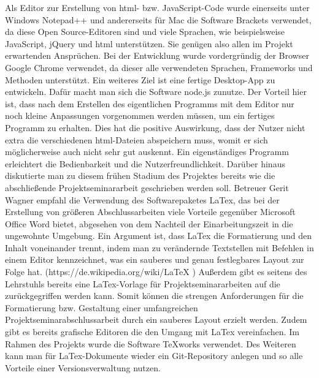Als Editor zur Erstellung von html- bzw. JavaScript-Code wurde einerseits unter Windows Notepad++ und andererseits für Mac die Software Brackets verwendet, da diese Open Source-Editoren sind und viele Sprachen, wie beispielsweise JavaScript, jQuery und html unterstützen. Sie genügen also allen im Projekt erwartenden Ansprüchen.
Bei der Entwicklung wurde vordergründig der Browser Google Chrome verwendet, da dieser alle verwendeten Sprachen, Frameworks und Methoden unterstützt. 
Ein weiteres Ziel ist eine fertige Desktop-App zu entwickeln. Dafür macht man sich die Software node.js zunutze. Der Vorteil hier ist, dass nach dem Erstellen des eigentlichen Programms mit dem Editor nur noch kleine Anpassungen vorgenommen werden müssen, um ein fertiges Programm zu erhalten. Dies hat die positive Auswirkung, dass der Nutzer nicht extra die verschiedenen html-Dateien abspeichern muss, womit er sich möglicherweise auch nicht sehr gut auskennt. Ein eigenständiges Programm erleichtert die Bedienbarkeit und die Nutzerfreundlichkeit. 
Darüber hinaus diskutierte man zu diesem frühen Stadium des Projektes bereits wie die abschließende Projektseminararbeit geschrieben werden soll. Betreuer Gerit Wagner empfahl die Verwendung des Softwarepaketes LaTex, das bei der Erstellung von größeren Abschlussarbeiten viele Vorteile gegenüber Microsoft Office Word bietet, abgesehen von dem Nachteil der Einarbeitungszeit in die ungewohnte Umgebung. Ein Argument ist, dass LaTex die Formatierung und den Inhalt voneinander trennt, indem man zu verändernde Textstellen mit Befehlen in einem Editor kennzeichnet, was ein sauberes und genau festlegbares Layout zur Folge hat. (https://de.wikipedia.org/wiki/LaTeX ) Außerdem gibt es seitens des Lehrstuhls bereits eine LaTex-Vorlage für Projektseminararbeiten auf die zurückgegriffen werden kann. Somit können die strengen Anforderungen für die Formatierung bzw. Gestaltung einer umfangreichen Projektseminarabschlussarbeit durch ein sauberes Layout erzielt werden. Zudem gibt es bereits grafische Editoren die den Umgang mit LaTex vereinfachen. Im Rahmen des Projekts wurde die Software TeXworks verwendet. Des Weiteren kann man für LaTex-Dokumente wieder ein Git-Repository anlegen und so alle Vorteile einer Versionsverwaltung nutzen.

